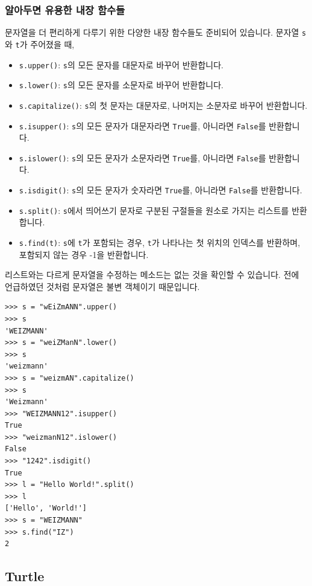 \documentclass[../main.tex]{subfiles}
\begin{document}
\subsubsection{알아두면 유용한 내장 함수들}
문자열을 더 편리하게 다루기 위한 다양한 내장 함수들도 준비되어 있습니다.
문자열 \texttt{s}와 \texttt{t}가 주어졌을 때,
\begin{itemize}
\item \texttt{s.upper()}: \texttt{s}의 모든 문자를 대문자로 바꾸어 반환합니다.
\item \texttt{s.lower()}: \texttt{s}의 모든 문자를 소문자로 바꾸어 반환합니다.
\item \texttt{s.capitalize()}: \texttt{s}의 첫 문자는 대문자로, 나머지는 소문자로 바꾸어 반환합니다.
\item \texttt{s.isupper()}: \texttt{s}의 모든 문자가 대문자라면 \texttt{True}를, 아니라면 \texttt{False}를 반환합니다.
\item \texttt{s.islower()}: \texttt{s}의 모든 문자가 소문자라면 \texttt{True}를, 아니라면 \texttt{False}를 반환합니다.
\item \texttt{s.isdigit()}: \texttt{s}의 모든 문자가 숫자라면 \texttt{True}를, 아니라면 \texttt{False}를 반환합니다.
\item \texttt{s.split()}: \texttt{s}에서 띄어쓰기 문자로 구분된 구절들을 원소로 가지는 리스트를 반환합니다.
\item \texttt{s.find(t)}: \texttt{s}에 \texttt{t}가 포함되는 경우, \texttt{t}가 나타나는 첫 위치의 인덱스를 반환하며, 포함되지 않는 경우 -1을 반환합니다.
\end{itemize}
리스트와는 다르게 문자열을 수정하는 메소드는 없는 것을 확인할 수 있습니다.
전에 언급하였던 것처럼 문자열은 불변 객체이기 때문입니다.
\begin{verbatim}
>>> s = "wEiZmANN".upper()
>>> s
'WEIZMANN'
>>> s = "weiZManN".lower()
>>> s
'weizmann'
>>> s = "weizmAN".capitalize()
>>> s
'Weizmann'
>>> "WEIZMANN12".isupper()
True
>>> "weizmanN12".islower()
False
>>> "1242".isdigit()
True
>>> l = "Hello World!".split()
>>> l
['Hello', 'World!']
>>> s = "WEIZMANN"
>>> s.find("IZ")
2
\end{verbatim}

\subsection{Turtle}
\end{document}
